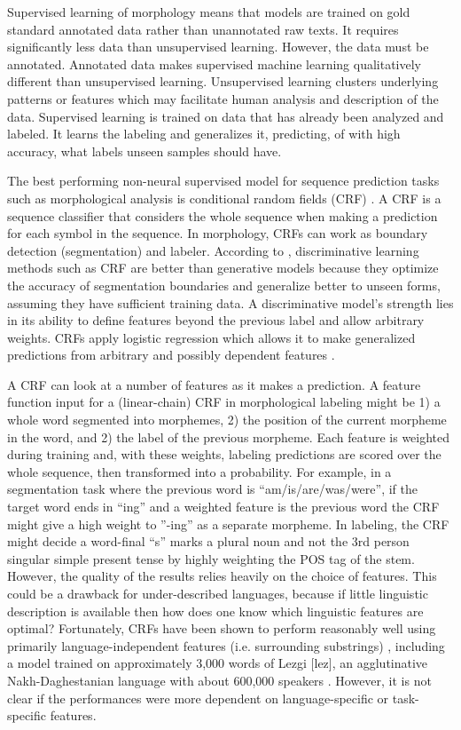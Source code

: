 \documentclass[12pt]{article}
\begin{document}
Supervised learning of morphology means that models are trained on gold standard annotated data rather than unannotated raw texts. It requires significantly less data than unsupervised learning. However, the data must be annotated. Annotated data makes supervised machine learning qualitatively different than unsupervised learning. Unsupervised learning clusters underlying patterns or features which may facilitate human analysis and description of the data. Supervised learning is trained on data that has already been analyzed and labeled. It learns the labeling and generalizes it, predicting, of with high accuracy, what labels unseen samples should have. 

The best performing non-neural supervised model for sequence prediction tasks such as morphological analysis is conditional random fields (CRF) \cite{lafferty_conditional_2001,muller_efficient_2013,ruokolainen_comparative_2016}. A CRF is a sequence classifier that considers the whole sequence when making a prediction for each symbol in the sequence. In morphology, CRFs can work as boundary detection (segmentation) and labeler. According to , discriminative learning methods such as CRF are better than generative models because they optimize the accuracy of segmentation boundaries and generalize better to unseen forms, assuming they have sufficient training data. A discriminative model's strength lies in its ability to define features beyond the previous label and allow arbitrary weights. CRFs apply logistic regression which allows it to make generalized predictions from arbitrary and possibly dependent features \cite{ruokolainen_supervised_2013}. 

A CRF can look at a number of features as it makes a prediction. A feature function input for a (linear-chain) CRF in morphological labeling might be 1) a whole word segmented into morphemes, 2) the position of the current morpheme in the word, and 2) the label of the previous morpheme. Each feature is weighted during training and, with these weights, labeling predictions are scored over the whole sequence, then transformed into a probability. For example, in a segmentation task where the previous word is ``am/is/are/was/were'', if the target word ends in ``ing'' and a weighted feature is the previous word the CRF might give a high weight to ''-ing'' as a separate morpheme. In labeling, the CRF might decide a word-final ``s'' marks a plural noun and not the 3rd person singular simple present tense by highly weighting the POS tag of the stem. However, the quality of the results relies heavily on the choice of features. This could be a drawback for under-described languages, because if little linguistic description is available then how does one know which linguistic features are optimal? Fortunately, CRFs have been shown to perform reasonably well using primarily language-independent features (i.e. surrounding substrings) \cite{ruokolainen_comparative_2016,moeller_automatic_2018}, including a model trained on approximately 3,000 words of Lezgi [lez], an agglutinative Nakh-Daghestanian language with about 600,000 speakers \cite{simons_ethnologue:_2018}. However, it is not  clear if the performances were more dependent on language-specific or task-specific features.
\end{document}
